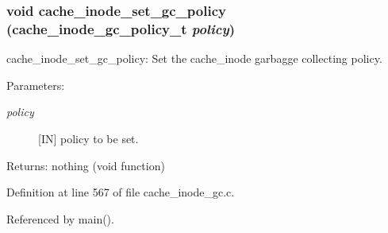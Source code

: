 \subsubsection{\setlength{\rightskip}{0pt plus 5cm}void cache\_\-inode\_\-set\_\-gc\_\-policy (cache\_\-inode\_\-gc\_\-policy\_\-t {\em policy})}\label{group__Cache__inode__gc__interface_ga0}


cache\_\-inode\_\-set\_\-gc\_\-policy: Set the cache\_\-inode garbagge collecting policy.

\begin{Desc}
\item[Parameters:]
\begin{description}
\item[{\em policy}][IN] policy to be set.\end{description}
\end{Desc}
\begin{Desc}
\item[Returns:]nothing (void function) \end{Desc}


Definition at line 567 of file cache\_\-inode\_\-gc.c.

Referenced by main().